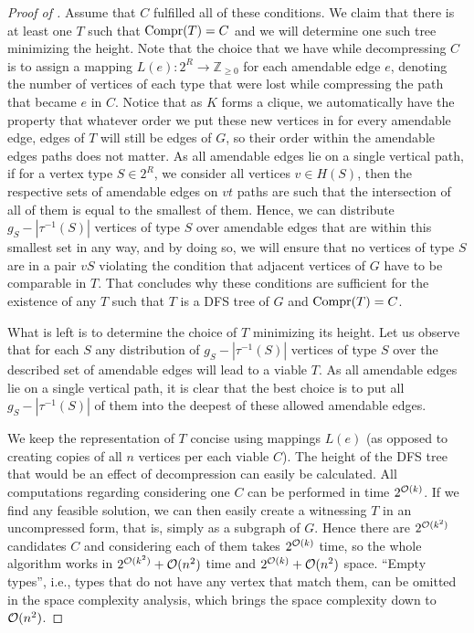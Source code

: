 \documentclass[a4paper,11pt]{article}
\begin{document}
\begin{proof}[Proof of ]
Assume that $C$ fulfilled all of these conditions. We claim that there is at least one $T$ such that $\mathrm{Compr}(T) = C$ and we will determine one such tree minimizing the height. Note that the choice that we have while decompressing $C$ is to assign a mapping $L(e) : 2^R \to \mathbb{Z}_{\ge 0}$ for each amendable edge $e$, denoting the number of vertices of each type that were lost while compressing the path that became $e$ in $C$. Notice that as $K$ forms a clique, we automatically have the property that whatever order we put these new vertices in for every amendable edge, edges of $T$ will still be edges of $G$, so their order within the amendable edges paths does not matter. As all amendable edges lie on a single vertical path, if for a vertex type $S \in 2^R$, we consider all vertices $v \in H(S)$, then the respective sets of amendable edges on $vt$ paths are such that the intersection of all of them is equal to the smallest of them. Hence, we can distribute $g_S - |\tau^{-1}(S)|$ vertices of type $S$ over amendable edges that are within this smallest set in any way, and by doing so, we will ensure that no vertices of type $S$ are in a pair $vS$ violating the condition that adjacent vertices of $G$ have to be comparable in $T$. That concludes why these conditions are sufficient for the existence of any $T$ such that $T$ is a DFS tree of $G$ and $\mathrm{Compr}(T) = C$.

What is left is to determine the choice of $T$ minimizing its height. Let us observe that for each $S$ any distribution of $g_S - |\tau^{-1}(S)|$ vertices of type $S$ over the described set of amendable edges will lead to a viable $T$. As all amendable edges lie on a single vertical path, it is clear that the best choice is to put all $g_S - |\tau^{-1}(S)|$ of them into the deepest of these allowed amendable edges.

We keep the representation of $T$ concise using mappings $L(e)$ (as opposed to creating copies of all $n$ vertices per each viable $C$). The height of the DFS tree that would be an effect of decompression can easily be calculated. 
All computations regarding considering one $C$ can be performed in time $2^{{\mathcal{O}}(k)}$. If we find any feasible solution, we can then easily create a witnessing $T$ in an uncompressed form, that is, simply as a subgraph of $G$. Hence there are $2^{{\mathcal{O}}(k^2)}$ candidates $C$ and considering each of them takes $2^{{\mathcal{O}}(k)}$ time, so the whole algorithm works in $2^{{\mathcal{O}}(k^2)} + {\mathcal{O}}(n^2)$ time and $2^{{\mathcal{O}}(k)} + {\mathcal{O}}(n^2)$ space.
``Empty types'', i.e., types that do not have any vertex that match them, can be omitted in the space complexity analysis, which brings the space complexity down to ${\mathcal{O}}(n^2)$.
%
\end{proof}
\end{document}

